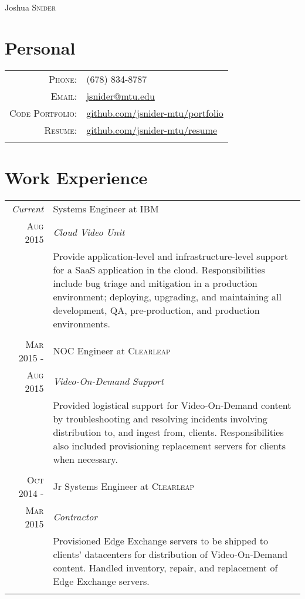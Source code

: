 \documentclass[a4paper,9pt]{extarticle}
\begin{document}
\pagestyle{empty}

\par{\centering
                {\Huge Joshua \textsc{Snider}
        }\bigskip\par}
\section{Personal}
\begin{tabular}{rl}
    \textsc{Phone:}          & (678) 834-8787\\
    \textsc{Email:}          & \href{mailto:jsnider@mtu.edu}{jsnider@mtu.edu}\\
    \textsc{Code Portfolio:} & \href{github.com/jsnider-mtu/portfolio}{github.com/jsnider-mtu/portfolio}\\
    \textsc{Resume:}         & \href{github.com/jsnider-mtu/resume}{github.com/jsnider-mtu/resume}\\
    \multicolumn{2}{c}{}\\
\end{tabular}

\section{Work Experience}
\begin{tabular}{r|p{8.5cm}}
 \emph{Current}&Systems Engineer at \textsc{IBM}\\\textsc{Aug 2015}&\emph{Cloud Video Unit}\\&\footnotesize{Provide application-level and infrastructure-level support for a SaaS application in the cloud. Responsibilities include bug triage and mitigation in a production environment; deploying, upgrading, and maintaining all development, QA, pre-production, and production environments.}\\\multicolumn{2}{c}{}\\
 \textsc{Mar 2015 -}&NOC Engineer at \textsc{Clearleap}\\\textsc{Aug 2015}&\emph{Video-On-Demand Support}\\&\footnotesize{Provided logistical support for Video-On-Demand content by troubleshooting and resolving incidents involving distribution to, and ingest from, clients. Responsibilities also included provisioning replacement servers for clients when necessary.}\\\multicolumn{2}{c}{}\\
 \textsc{Oct 2014 -}&Jr Systems Engineer at \textsc{Clearleap}\\\textsc{Mar 2015}&\emph{Contractor}\\&\footnotesize{Provisioned Edge Exchange servers to be shipped to clients' datacenters for distribution of Video-On-Demand content. Handled inventory, repair, and replacement of Edge Exchange servers.}\\\multicolumn{2}{c}{}\\
\end{tabular}
\end{document}
